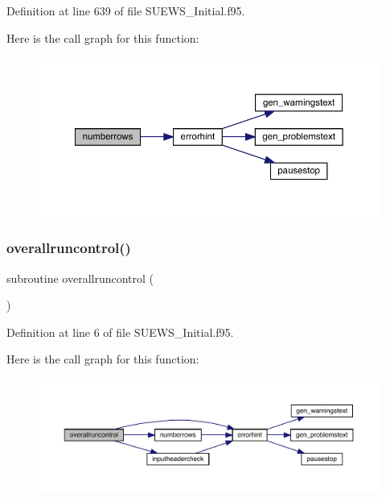 Definition at line 639 of file S\+U\+E\+W\+S\+\_\+\+Initial.\+f95.

Here is the call graph for this function\+:\nopagebreak
\begin{figure}[H]
\begin{center}
\leavevmode
\includegraphics[width=350pt]{_s_u_e_w_s___initial_8f95_ae822e367ccfe96c8a005e1ca117059eb_cgraph}
\end{center}
\end{figure}
\mbox{\label{_s_u_e_w_s___initial_8f95_a328749e978914d5cb633b8d642a92d75}} 
\subsubsection{\texorpdfstring{overallruncontrol()}{overallruncontrol()}}
{\footnotesize\ttfamily subroutine overallruncontrol (\begin{DoxyParamCaption}{ }\end{DoxyParamCaption})}



Definition at line 6 of file S\+U\+E\+W\+S\+\_\+\+Initial.\+f95.

Here is the call graph for this function\+:\nopagebreak
\begin{figure}[H]
\begin{center}
\leavevmode
\includegraphics[width=350pt]{_s_u_e_w_s___initial_8f95_a328749e978914d5cb633b8d642a92d75_cgraph}
\end{center}
\end{figure}
\mbox{\label{_s_u_e_w_s___initial_8f95_aecb9f7926254a01f8ea8e4f74fe2f6c1}} 
